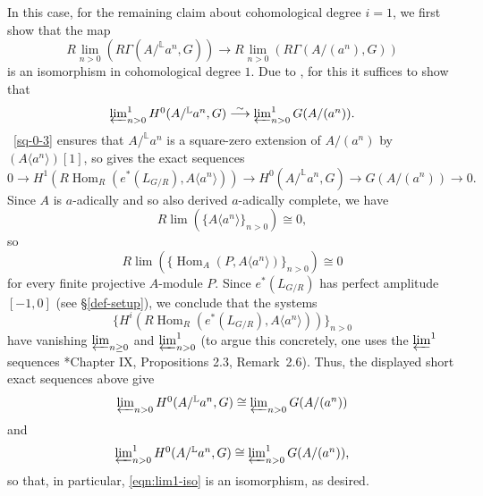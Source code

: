 \documentclass[11pt, reqno]{amsart}
\newcommand{\bL}{\mathbb{L}}
\DeclareMathOperator{\Hom}{Hom}		%
\newcommand{\isomto}{\overset{\sim}{\longrightarrow}}
\newcommand{\ra}{\rightarrow}
\newcommand{\tst}{\textstyle}
\newcommand{\be}{\begin{equation}}
\newcommand{\ee}{\end{equation}}
\numberwithin{equation}{numberingbase}
\theoremstyle{thms}
\theoremstyle{claims}
\theoremstyle{defs}
\theoremstyle{thms}
\theoremstyle{defs}
\theoremstyle{subsection-tweak}
\theoremstyle{subsection-tweak}
\begin{document}
In this case, for the remaining claim about cohomological degree $i = 1$, we first show that the map 
\[
\tst R\lim_{n > 0}( R\Gamma(A/^\bL a^n, G)) \ra R\lim_{n > 0}( R\Gamma(A/(a^n), G))
\]
is an isomorphism in cohomological degree $1$. Due to , for this it suffices to show that
\be \label{eqn:lim1-iso}
\tst \varprojlim_{n > 0}^1 H^0(A/^\bL a^n, G) \isomto \varprojlim_{n > 0}^1 G(A/(a^n)).
\ee
{}~\ref{sq-0-3} ensures that $A/^\bL a^n$ is a square-zero extension of $A/(a^n)$ by $(A\langle a^n\rangle)[1]$, so  gives the exact sequences
\[
0 \ra H^1(R\Hom_R(e^*(L_{G/R}), A\langle a^n\rangle)) \ra H^0(A/^\bL a^n, G) \ra G(A/(a^n)) \ra 0. 
\]
Since $A$ is $a$-adically and so also derived $a$-adically complete, we have 
\[
R\lim(\{A\langle a^n\rangle\}_{n > 0}) \cong 0,
\]
so
\[
R\lim(\{\Hom_A(P, A\langle a^n\rangle)\}_{n > 0}) \cong 0
\]
for every finite projective $A$-module $P$. Since $e^*(L_{G/R})$ has perfect amplitude $[-1, 0]$ (see \S\ref{def-setup}), we conclude that the systems 
\[
\tst \{H^i(R\Hom_R(e^*(L_{G/R}), A\langle a^n\rangle))\}_{n > 0}
\]
have vanishing $\varprojlim_{n\ge 0}$ and $\varprojlim_{n > 0}^1$ (to argue this concretely, one uses the $\varprojlim^1$ sequences \cite{BK72}*{Chapter IX, Propositions 2.3, Remark~2.6}). Thus, the displayed short exact sequences above give
\[
\tst \varprojlim_{n > 0} H^0(A/^\bL a^n, G) \cong \varprojlim_{n> 0} G(A/(a^n)) 
\]
and
\[
\tst \varprojlim_{n > 0}^1 H^0(A/^\bL a^n, G) \cong \varprojlim_{n> 0}^1 G(A/(a^n)),
\]
so that, in particular, \eqref{eqn:lim1-iso} is an isomorphism, as desired. 
\end{document}
